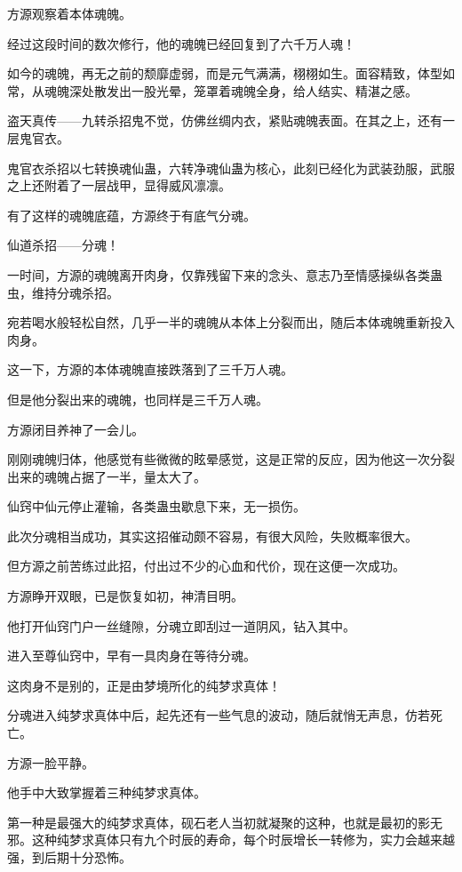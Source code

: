 
\begin{this_body}

方源观察着本体魂魄。

经过这段时间的数次修行，他的魂魄已经回复到了六千万人魂！

如今的魂魄，再无之前的颓靡虚弱，而是元气满满，栩栩如生。面容精致，体型如常，从魂魄深处散发出一股光晕，笼罩着魂魄全身，给人结实、精湛之感。

盗天真传——九转杀招鬼不觉，仿佛丝绸内衣，紧贴魂魄表面。在其之上，还有一层鬼官衣。

鬼官衣杀招以七转换魂仙蛊，六转净魂仙蛊为核心，此刻已经化为武装劲服，武服之上还附着了一层战甲，显得威风凛凛。

有了这样的魂魄底蕴，方源终于有底气分魂。

仙道杀招——分魂！

一时间，方源的魂魄离开肉身，仅靠残留下来的念头、意志乃至情感操纵各类蛊虫，维持分魂杀招。

宛若喝水般轻松自然，几乎一半的魂魄从本体上分裂而出，随后本体魂魄重新投入肉身。

这一下，方源的本体魂魄直接跌落到了三千万人魂。

但是他分裂出来的魂魄，也同样是三千万人魂。

方源闭目养神了一会儿。

刚刚魂魄归体，他感觉有些微微的眩晕感觉，这是正常的反应，因为他这一次分裂出来的魂魄占据了一半，量太大了。

仙窍中仙元停止灌输，各类蛊虫歇息下来，无一损伤。

此次分魂相当成功，其实这招催动颇不容易，有很大风险，失败概率很大。

但方源之前苦练过此招，付出过不少的心血和代价，现在这便一次成功。

方源睁开双眼，已是恢复如初，神清目明。

他打开仙窍门户一丝缝隙，分魂立即刮过一道阴风，钻入其中。

进入至尊仙窍中，早有一具肉身在等待分魂。

这肉身不是别的，正是由梦境所化的纯梦求真体！

分魂进入纯梦求真体中后，起先还有一些气息的波动，随后就悄无声息，仿若死亡。

方源一脸平静。

他手中大致掌握着三种纯梦求真体。

第一种是最强大的纯梦求真体，砚石老人当初就凝聚的这种，也就是最初的影无邪。这种纯梦求真体只有九个时辰的寿命，每个时辰增长一转修为，实力会越来越强，到后期十分恐怖。


\end{this_body}
